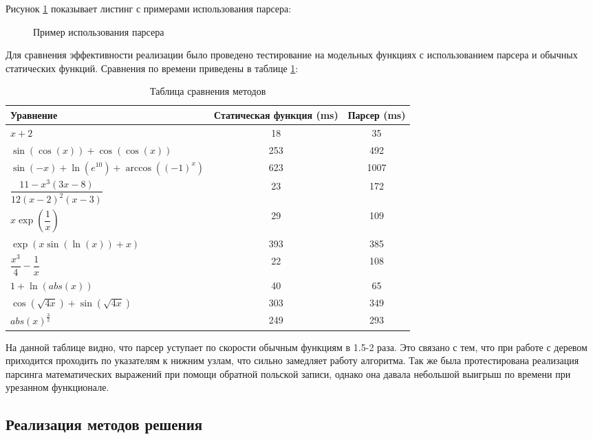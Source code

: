 Рисунок \ref{src:FuncMaker} показывает листинг с примерами использования парсера:

\begin{figure}
    
    \caption{Пример использования парсера}
    \label{src:FuncMaker}
\end{figure}

Для сравнения эффективности реализации было проведено тестирование на модельных функциях с использованием парсера и обычных
статических функций. Сравнения по времени приведены в таблице \ref{tab:Banchmark}:

\begin{table}    
    \caption{Таблица сравнения методов}
    \begin{tabularx}{\textwidth}{|X|c|c|}
    \hline
    Уравнение & Статическая функция (ms) & Парсер (ms)\\
    \hline
    $x + 2$ & 18 & 35\\
    \hline
    $\sin(\cos(x)) + \cos(\cos(x))$ & 253 & 492\\
    \hline
    $\sin(-x) + \ln(e^{10}) + \arccos((-1)^x)$ & 623 & 1007\\
    \hline
    $\dfrac{11 - x^3 (3x - 8)}{12(x - 2)^2 (x - 3)}$ & 23 & 172\\
    \hline
    $x\exp(\dfrac{1}{x})$ & 29 & 109\\
    \hline
    $\exp(x\sin(\ln(x)) + x)$ & 393 & 385\\
    \hline
    $\dfrac{x^3}{4} - \dfrac{1}{x}$ & 22 & 108\\
    \hline
    $1 + \ln(abs(x))$ & 40 & 65\\
    \hline
    $\cos(\sqrt{4x}) + \sin(\sqrt{4x})$ & 303 & 349\\
    \hline
    $abs(x)^\frac{3}{2}$ & 249 & 293\\
    \hline
    \end{tabularx}
    \label{tab:Banchmark}
\end{table}

На данной таблице видно, что парсер уступает по скорости обычным функциям в 1.5-2 раза. Это связано с тем, что при работе с деревом
приходится проходить по указателям к нижним узлам, что сильно замедляет работу алгоритма.
Так же была протестирована реализация парсинга математических выражений при помощи обратной польской записи, однако она давала небольшой
выигрыш по времени при урезанном функционале.

\subsection{Реализация методов решения}


